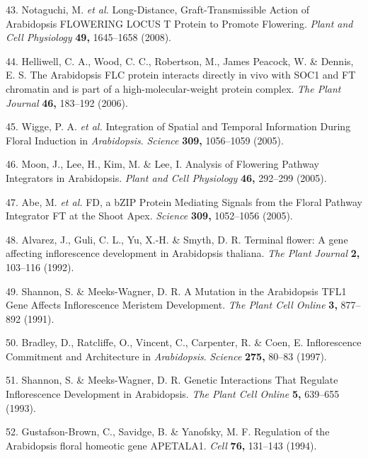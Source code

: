 \documentclass[12pt,]{book}
\begin{document}
\hypertarget{ref-notaguchi_long_distance_2008}{}
43. Notaguchi, M. \emph{et al.} Long-Distance, Graft-Transmissible
Action of Arabidopsis FLOWERING LOCUS T Protein to Promote Flowering.
\emph{Plant and Cell Physiology} \textbf{49,} 1645--1658 (2008).

\hypertarget{ref-helliwell_arabidopsis_2006}{}
44. Helliwell, C. A., Wood, C. C., Robertson, M., James Peacock, W. \&
Dennis, E. S. The Arabidopsis FLC protein interacts directly in vivo
with SOC1 and FT chromatin and is part of a high-molecular-weight
protein complex. \emph{The Plant Journal} \textbf{46,} 183--192 (2006).

\hypertarget{ref-wigge_integration_2005}{}
45. Wigge, P. A. \emph{et al.} Integration of Spatial and Temporal
Information During Floral Induction in \emph{Arabidopsis}.
\emph{Science} \textbf{309,} 1056--1059 (2005).

\hypertarget{ref-moon_analysis_2005}{}
46. Moon, J., Lee, H., Kim, M. \& Lee, I. Analysis of Flowering Pathway
Integrators in Arabidopsis. \emph{Plant and Cell Physiology}
\textbf{46,} 292--299 (2005).

\hypertarget{ref-abe_fd_2005}{}
47. Abe, M. \emph{et al.} FD, a bZIP Protein Mediating Signals from the
Floral Pathway Integrator FT at the Shoot Apex. \emph{Science}
\textbf{309,} 1052--1056 (2005).

\hypertarget{ref-alvarez_terminal_1992}{}
48. Alvarez, J., Guli, C. L., Yu, X.-H. \& Smyth, D. R. Terminal flower:
A gene affecting inflorescence development in Arabidopsis thaliana.
\emph{The Plant Journal} \textbf{2,} 103--116 (1992).

\hypertarget{ref-shannon_mutation_1991}{}
49. Shannon, S. \& Meeks-Wagner, D. R. A Mutation in the Arabidopsis
TFL1 Gene Affects Inflorescence Meristem Development. \emph{The Plant
Cell Online} \textbf{3,} 877--892 (1991).

\hypertarget{ref-bradley_inflorescence_1997}{}
50. Bradley, D., Ratcliffe, O., Vincent, C., Carpenter, R. \& Coen, E.
Inflorescence Commitment and Architecture in \emph{Arabidopsis}.
\emph{Science} \textbf{275,} 80--83 (1997).

\hypertarget{ref-shannon_genetic_1993}{}
51. Shannon, S. \& Meeks-Wagner, D. R. Genetic Interactions That
Regulate Inflorescence Development in Arabidopsis. \emph{The Plant Cell
Online} \textbf{5,} 639--655 (1993).

\hypertarget{ref-gustafson_brown_regulation_1994}{}
52. Gustafson-Brown, C., Savidge, B. \& Yanofsky, M. F. Regulation of
the Arabidopsis floral homeotic gene APETALA1. \emph{Cell} \textbf{76,}
131--143 (1994).
\end{document}
